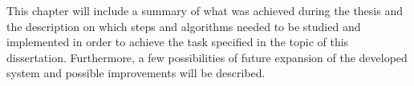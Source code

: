 This chapter will include a summary of what was achieved during the thesis and the description on which steps and algorithms needed to be studied and implemented in order to achieve the task specified in the topic of this dissertation. Furthermore, a few possibilities of future expansion of the developed system and possible improvements will be described.


